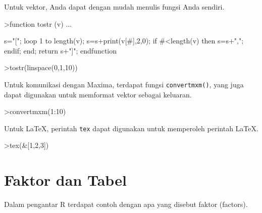 \documentclass[a4paper,11pt,oneside,enabledeprecatedfontcommands]{scrbook}
\newenvironment{eulernotebook}{}{}
\newcommand{\eulerheading}[1]{\chapter{#1}}
\newenvironment{eulercomment}{\par\medskip\noindent}{\par\medskip}
\begin{document}
\begin{eulernotebook}
\begin{eulercomment}
			Untuk vektor, Anda dapat dengan mudah menulis fungsi Anda sendiri.
		\end{eulercomment}
		\begin{eulerprompt}
			>function tostr (v) ...
		\end{eulerprompt}
		\begin{eulerudf}
			s="[";
			loop 1 to length(v);
			   s=s+print(v[#],2,0);
			   if #<length(v) then s=s+","; endif;
			end;
			return s+"]";
			endfunction
		\end{eulerudf}
		\begin{eulerprompt}
			>tostr(linspace(0,1,10))
		\end{eulerprompt}
		\begin{euleroutput}
			[0.00,0.10,0.20,0.30,0.40,0.50,0.60,0.70,0.80,0.90,1.00]
		\end{euleroutput}
		\begin{eulercomment}
			Untuk komunikasi dengan Maxima, terdapat fungsi \texttt{convertmxm()}, yang juga dapat digunakan untuk
			memformat vektor sebagai keluaran.
		\end{eulercomment}
		\begin{eulerprompt}
			>convertmxm(1:10)
		\end{eulerprompt}
		\begin{euleroutput}
			[1,2,3,4,5,6,7,8,9,10]
		\end{euleroutput}
		\begin{eulercomment}
			Untuk LaTeX, perintah \texttt{tex} dapat digunakan untuk memperoleh perintah LaTeX.
		\end{eulercomment}
		\begin{eulerprompt}
			>tex(&[1,2,3])
		\end{eulerprompt}
		\begin{euleroutput}
			\left[ 1 , 2 , 3 \right] 
		\end{euleroutput}
		
		\eulerheading{Faktor dan Tabel}
		\begin{eulercomment}
			Dalam pengantar R terdapat contoh dengan apa yang disebut faktor (factors).
			

\end{eulercomment}
\end{eulernotebook}
\end{document}
